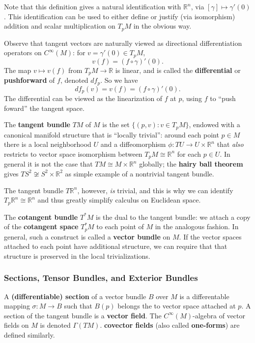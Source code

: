 \documentclass[reqno]{amsart}
\numberwithin{equation}{section}
\begin{document}
Note that this definition gives a natural identification with $\mathbb R^n$, via $[\gamma] \mapsto \gamma'(0)$.
This identification can be used to either define or justify (via isomorphism) addition and scalar multiplication
on $T_pM$ in the obvious way.

Observe that tangent vectors are naturally viewed as directional differentiation operators on $C^{\infty}(M)$: for
$v = \gamma'(0) \in T_pM$,
$$
    v(f) = (f \circ \gamma)'(0).
$$
The map $v \mapsto v(f)$ from $T_pM \to \mathbb R$ is linear, and is called the \textbf{differential} or
\textbf{pushforward} of $f$, denoted $df_p$. So we have
$$
    df_p(v) = v(f) = (f \circ \gamma)'(0).
$$
The differential can be viewed as the linearization of $f$ at $p$, using $f$ to ``push foward'' the tangent space.

The \textbf{tangent bundle} $TM$ of $M$ is the set $\{ (p, v) : v \in T_pM \}$, endowed with a canonical manifold
structure that is ``locally trivial'': around each point $p \in M$ there is a local neighborhood $U$
and a diffeomorphism $\phi : TU \to U \times \mathbb R^n$ that \emph{also} restricts to vector space isomorphism
between $T_p M \cong \mathbb R^n$ for each $p \in U$. In general it is not the case that $TM \cong M \times \mathbb R^n$
globally; the \textbf{hairy ball theorem} gives $TS^2 \not \cong S^2 \times \mathbb R^2$ as simple example of a
nontrivial tangent bundle.

The tangent bundle $T\mathbb R^n$, however, \emph{is} trivial, and this is why we can identify
$T_p\mathbb R^n \cong \mathbb R^n$ and thus greatly simplify calculus on Euclidean space.

The \textbf{cotangent bundle} $T^*M$ is the dual to the tangent bundle: we attach a copy of the
\textbf{cotangent space} $T^*_pM$ to each point of $M$ in the analogous fashion. In general, such a construct is
called a \textbf{vector bundle} on $M$. If the vector spaces attached to each point have additional structure,
we can require that that structure is preserved in the local trivializations.

\subsubsection{Sections, Tensor Bundles, and Exterior Bundles}

A \textbf{(differentiable) section} of a vector bundle $B$ over $M$ is a differentable mapping
$\sigma : M \to B$ such that $B(p)$ belongs the to vector space attached at $p$. A section of the tangent bundle
is a \textbf{vector field}. The $C^{\infty}(M)$-algebra of vector fields on $M$ is denoted $\Gamma(TM)$.
\textbf{covector fields} (also called \textbf{one-forms}) are defined similarly.
\end{document}
